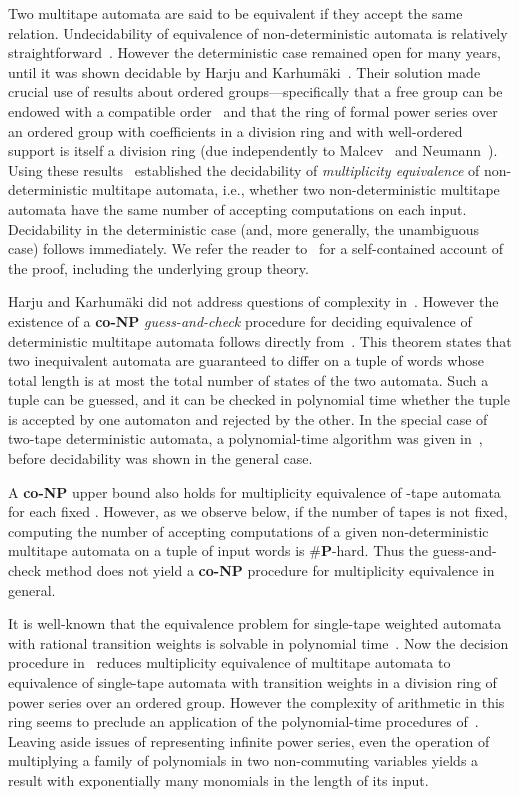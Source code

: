 \documentclass[runningheads]{llncs}
\begin{document}
Two multitape automata are said to be equivalent if they accept the
same relation.  Undecidability of equivalence of non-deterministic
automata is relatively straightforward~\cite{Griffiths68}.  However
the deterministic case remained open for many years, until it was
shown decidable by Harju and Karhum\"{a}ki~\cite{HarjuK91}.  Their
solution made crucial use of results about ordered
groups---specifically that a free group can be endowed with a
compatible order~\cite{Neumann49b} and that the ring of formal power
series over an ordered group with coefficients in a division ring and
with well-ordered support is itself a division ring (due independently
to Malcev~\cite{Malcev48} and Neumann~\cite{Neumann49}).  Using these
results~\cite{HarjuK91} established the decidability of
\emph{multiplicity equivalence} of non-deterministic multitape
automata, i.e., whether two non-deterministic multitape automata have
the same number of accepting computations on each input.  Decidability
in the deterministic case (and, more generally, the unambiguous case)
follows immediately.  We refer the reader to~\cite{Sakarovich03} for a
self-contained account of the proof, including the underlying group
theory.

Harju and Karhum\"{a}ki did not address questions of complexity
in~\cite{HarjuK91}.  However the existence of a \textbf{co-NP}
\emph{guess-and-check} procedure for deciding equivalence of
deterministic multitape automata follows directly from~\cite[Theorem
  8]{HarjuK91}.  This theorem states that two inequivalent automata
are guaranteed to differ on a tuple of words whose total length is at
most the total number of states of the two automata. Such a tuple can
be guessed, and it can be checked in polynomial time whether the tuple
is accepted by one automaton and rejected by the other.  In the
special case of two-tape deterministic automata, a polynomial-time
algorithm was given in~\cite{FriedmanG82}, before decidability was
shown in the general case.

A \textbf{co-NP} upper bound also holds for multiplicity equivalence
of -tape automata for each fixed .  However, as we observe
below, if the number of tapes is not fixed, computing the number of
accepting computations of a given non-deterministic multitape automata
on a tuple of input words is \#\textbf{P}-hard.  Thus the
guess-and-check method does not yield a \textbf{co-NP} procedure for
multiplicity equivalence in general.

It is well-known that the equivalence problem for single-tape weighted
automata with rational transition weights is solvable in polynomial
time~\cite{Schutzenberger61,Tzeng}.  Now the decision procedure
in~\cite{HarjuK91} reduces multiplicity equivalence of multitape
automata to equivalence of single-tape automata with transition
weights in a division ring of power series over an ordered group.
However the complexity of arithmetic in this ring seems to preclude an
application of the polynomial-time procedures
of~\cite{Schutzenberger61,Tzeng}.  Leaving aside issues of
representing infinite power series, even the operation of multiplying
a family of polynomials in two non-commuting variables yields a result
with exponentially many monomials in the length of its input.
\end{document}
